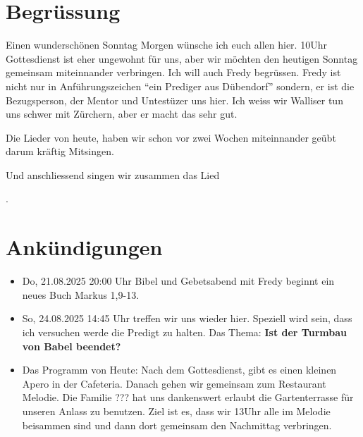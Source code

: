 \documentclass{../../inc/mybib}
\begin{document}
\section{Begrüssung}
Einen wunderschönen Sonntag Morgen wünsche ich euch allen hier. 10Uhr Gottesdienst ist eher ungewohnt für uns, aber wir möchten den heutigen Sonntag gemeinsam miteinnander verbringen. Ich will auch Fredy begrüssen. Fredy ist nicht nur in Anführungszeichen \enquote{ein Prediger aus Dübendorf} sondern, er ist die Bezugsperson, der Mentor und Untestüzer uns hier. Ich weiss wir Walliser tun uns schwer mit Zürchern, aber er macht das sehr gut.

Die Lieder von heute, haben wir schon vor zwei Wochen miteinnander geübt darum kräftig Mitsingen.

\beten{} Und anschliessend singen wir zusammen das Lied

{}.

\section{Ankündigungen}
\begin{itemize}
    \item {} Do, 21.08.2025 20:00 Uhr Bibel und Gebetsabend mit Fredy  beginnt ein neues Buch Markus 1,9-13.
    \item {} So, 24.08.2025 14:45 Uhr treffen wir uns wieder hier. Speziell wird sein, dass ich versuchen werde die Predigt zu halten. Das Thema: \textbf{Ist der Turmbau von Babel beendet?}
    \item {} Das Programm von Heute: Nach dem Gottesdienst, gibt es einen kleinen Apero in der Cafeteria. Danach gehen wir gemeinsam zum Restaurant Melodie. Die Familie ??? hat uns dankenswert erlaubt die Gartenterrasse für unseren Anlass zu benutzen.
    Ziel ist es, dass wir 13Uhr alle im Melodie beisammen sind und dann dort gemeinsam den Nachmittag verbringen.
\end{itemize}
\end{document}
